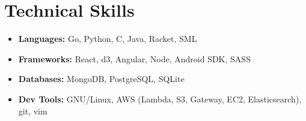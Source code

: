 \documentclass[letterpaper,11pt]{article}
\newcommand{\resumeSubHeadingListStart}{\begin{itemize}[leftmargin=*]}
\newcommand{\resumeSubHeadingListEnd}{\end{itemize}}
\begin{document}
\section{Technical Skills}
  \resumeSubHeadingListStart
    \item{
            \textbf{Languages:} {Go, Python, C, Java, Racket, SML}
        }
    \item{
            \textbf{Frameworks:} {React, d3, Angular, Node, Android SDK, SASS}
        }
    \item{
            \textbf{Databases:} {MongoDB, PostgreSQL, SQLite}
        }
    \item{
            \textbf{Dev Tools:} {GNU/Linux, AWS (Lambda, S3, Gateway, EC2, Elasticsearch), git, vim}
        }
 \resumeSubHeadingListEnd


\end{document}
